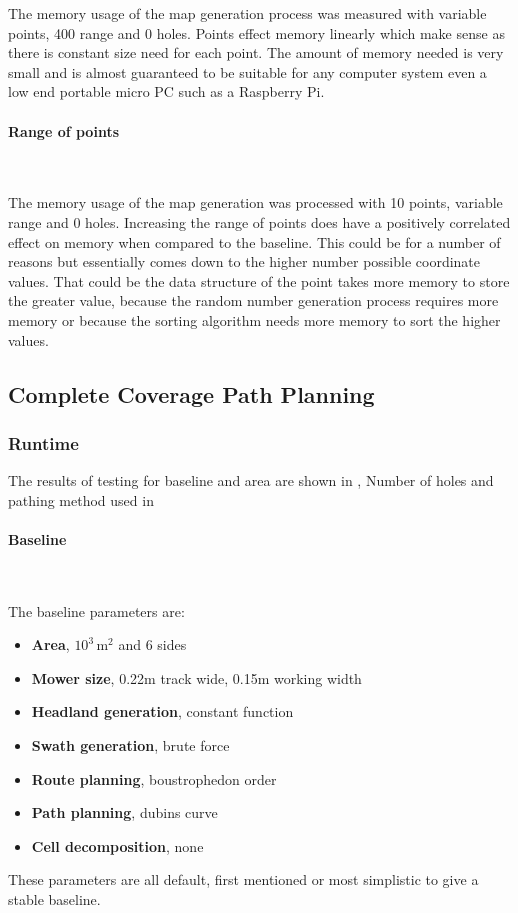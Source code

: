 \documentclass[final]{cmpreport_02}
\begin{document}
The memory usage of the map generation process was measured with variable points, 400 range and 0 holes.
Points effect memory linearly which make sense as there is constant size need for each point.
The amount of memory needed is very small and is almost guaranteed to be suitable for any computer system even a low end portable micro PC such as a Raspberry Pi.


\paragraph{Range of points} \

The memory usage of the map generation was processed with 10 points, variable range and 0 holes.
Increasing the range of points does have a positively correlated effect on memory when compared to the baseline.
This could be for a number of reasons but essentially comes down to the higher number possible coordinate values.
That could be the data structure of the point takes more memory to store the greater value, because the random number generation process requires more memory or because the sorting algorithm needs more memory to sort the higher values.


\subsection{Complete Coverage Path Planning}
\subsubsection{Runtime}
The results of testing for baseline and area are shown in , Number of holes and pathing method used in 

\paragraph{Baseline} \

The baseline parameters are:

\begin{itemize}
	\item{\textbf{Area}, $10^3\,\text{m}^2$ and 6 sides}
	\item{\textbf{Mower size}, 0.22m track wide, 0.15m working width}
	\item{\textbf{Headland generation}, constant function}
	\item{\textbf{Swath generation}, brute force}
	\item{\textbf{Route planning}, boustrophedon order}
	\item{\textbf{Path planning}, dubins curve}
	\item{\textbf{Cell decomposition}, none}
\end{itemize}
These parameters are all default, first mentioned or most simplistic to give a stable baseline.
\end{document}
